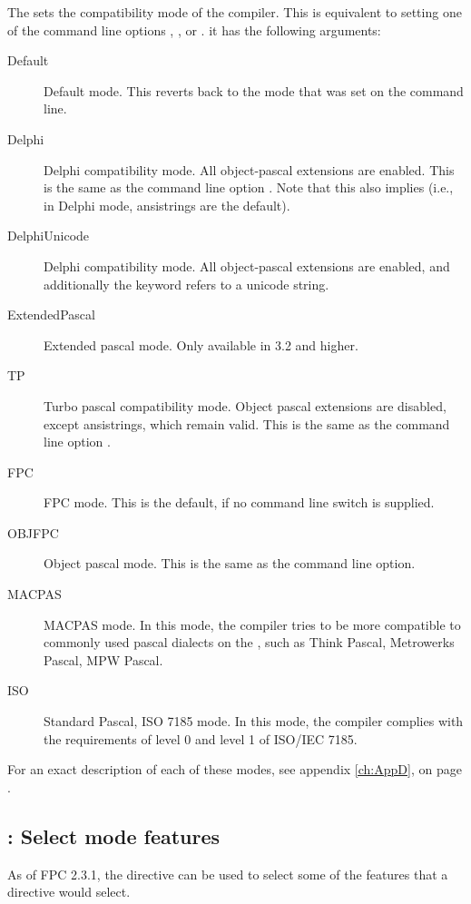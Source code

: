 The  sets the compatibility mode of the compiler. This
is equivalent to setting one of the command line options ,
,  or . it has the following arguments:
\begin{description}
\item[Default] Default mode. This reverts back to the mode that was set on
the command line.
\item[Delphi] Delphi compatibility mode. All object-pascal extensions are
enabled. This is the same as the command line option . Note that
this also implies  (i.e., in Delphi mode, ansistrings are
the default).
\item[DelphiUnicode] Delphi compatibility mode. All object-pascal extensions are
enabled, and additionally the  keyword refers to a unicode
string. 
\item[ExtendedPascal] Extended pascal mode. Only available in 3.2 and
higher.
\item[TP] Turbo pascal compatibility mode. Object pascal extensions are
disabled, except ansistrings, which remain valid.
This is the same as the command line option .
\item[FPC] FPC mode. This is the default, if no command line switch is
supplied.
\item[OBJFPC] Object pascal mode. This is the same as the 
command line option.
\item[MACPAS] MACPAS mode. In this mode, the compiler tries to be more compatible
to commonly used pascal dialects on the \macos, such as Think Pascal, Metrowerks 
Pascal, MPW Pascal. 
\item[ISO] Standard Pascal, ISO 7185 mode. In this mode, the compiler complies 
with the requirements of level 0 and level 1 of ISO/IEC 7185.
\end{description}

For an exact description of each of these modes, see appendix \ref{ch:AppD},
on page \pageref{ch:AppD}.

\subsection{ : Select mode features}
As of FPC 2.3.1, the  directive can be used to select 
some of the features that a  directive would select.

